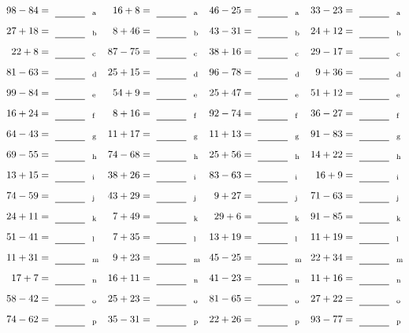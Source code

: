 \documentclass
[
  draft    = true,
  fontsize = 11pt,
  parskip  = half-
]
{scrartcl}
\begin{document}
\clearpage
\begin{align*}
    \pline{98-84}&=\rline{a}
  & \pline{16+8}&=\rline{a}
  & \pline{46-25}&=\rline{a}
  & \pline{33-23}&=\rline{a} \\[1ex]
    \pline{27+18}&=\rline{b}
  & \pline{8+46}&=\rline{b}
  & \pline{43-31}&=\rline{b}
  & \pline{24+12}&=\rline{b} \\[1ex]
    \pline{22+8}&=\rline{c}
  & \pline{87-75}&=\rline{c}
  & \pline{38+16}&=\rline{c}
  & \pline{29-17}&=\rline{c} \\[1ex]
    \pline{81-63}&=\rline{d}
  & \pline{25+15}&=\rline{d}
  & \pline{96-78}&=\rline{d}
  & \pline{9+36}&=\rline{d} \\[1ex]
    \pline{99-84}&=\rline{e}
  & \pline{54+9}&=\rline{e}
  & \pline{25+47}&=\rline{e}
  & \pline{51+12}&=\rline{e} \\[1ex]
    \pline{16+24}&=\rline{f}
  & \pline{8+16}&=\rline{f}
  & \pline{92-74}&=\rline{f}
  & \pline{36-27}&=\rline{f} \\[1ex]
    \pline{64-43}&=\rline{g}
  & \pline{11+17}&=\rline{g}
  & \pline{11+13}&=\rline{g}
  & \pline{91-83}&=\rline{g} \\[1ex]
    \pline{69-55}&=\rline{h}
  & \pline{74-68}&=\rline{h}
  & \pline{25+56}&=\rline{h}
  & \pline{14+22}&=\rline{h} \\[1ex]
    \pline{13+15}&=\rline{i}
  & \pline{38+26}&=\rline{i}
  & \pline{83-63}&=\rline{i}
  & \pline{16+9}&=\rline{i} \\[1ex]
    \pline{74-59}&=\rline{j}
  & \pline{43+29}&=\rline{j}
  & \pline{9+27}&=\rline{j}
  & \pline{71-63}&=\rline{j} \\[1ex]
    \pline{24+11}&=\rline{k}
  & \pline{7+49}&=\rline{k}
  & \pline{29+6}&=\rline{k}
  & \pline{91-85}&=\rline{k} \\[1ex]
    \pline{51-41}&=\rline{l}
  & \pline{7+35}&=\rline{l}
  & \pline{13+19}&=\rline{l}
  & \pline{11+19}&=\rline{l} \\[1ex]
    \pline{11+31}&=\rline{m}
  & \pline{9+23}&=\rline{m}
  & \pline{45-25}&=\rline{m}
  & \pline{22+34}&=\rline{m} \\[1ex]
    \pline{17+7}&=\rline{n}
  & \pline{16+11}&=\rline{n}
  & \pline{41-23}&=\rline{n}
  & \pline{11+16}&=\rline{n} \\[1ex]
    \pline{58-42}&=\rline{o}
  & \pline{25+23}&=\rline{o}
  & \pline{81-65}&=\rline{o}
  & \pline{27+22}&=\rline{o} \\[1ex]
    \pline{74-62}&=\rline{p}
  & \pline{35-31}&=\rline{p}
  & \pline{22+26}&=\rline{p}
  & \pline{93-77}&=\rline{p}
\end{align*}
\end{document}
